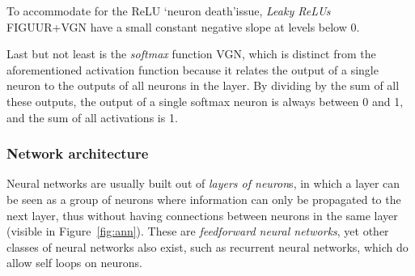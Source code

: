 To accommodate for the ReLU \textquoteleft neuron death\textquoteright  issue, \textit{Leaky ReLUs} FIGUUR+VGN have a small constant negative slope at levels below 0.


Last but not least is the \textit{softmax} function VGN, which is distinct from the aforementioned activation function because it relates the output of a single neuron to the outputs of all neurons in the layer. By dividing by the sum of all these outputs, the output of a single softmax neuron is always between 0 and 1, and the sum of all activations is 1. 

\subsubsection{Network architecture \label{subsubsec:archi}}
Neural networks are usually built out of \textit{layers of neuron}s, in which a layer can be seen as a group of neurons where information can only be propagated to the next layer, thus without having connections between neurons in the same layer (visible in Figure~\ref{fig:ann}). These are \textit{feedforward neural networks}, yet other classes of neural networks also exist, such as recurrent neural networks, which do allow self loops on neurons.



